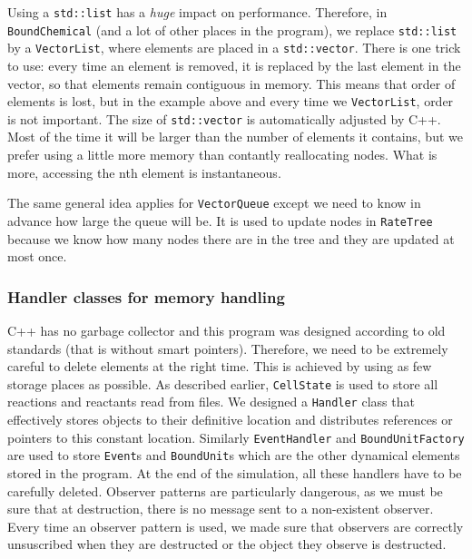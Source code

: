 Using a \texttt{std::list} has a \emph{huge} impact on performance. Therefore, in \texttt{BoundChemical} (and a lot of other places in the program), we replace \texttt{std::list} by a \texttt{VectorList}, where elements are placed in a \texttt{std::vector}. There is one trick to use: every time an element is removed, it is replaced by the last element in the vector, so that elements remain contiguous in memory. This means that order of elements is lost, but in the example above and every time we \texttt{VectorList}, order is not important. The size of \texttt{std::vector} is automatically adjusted by C++. Most of the time it will be larger than the number of elements it contains, but we prefer using a little more memory than contantly reallocating nodes. What is more, accessing the nth element is instantaneous.

The same general idea applies for \texttt{VectorQueue} except we need to know in advance how large the queue will be. It is used to update nodes in \texttt{RateTree} because we know how many nodes there are in the tree and they are updated at most once.

\subsubsection{Handler classes for memory handling}

C++ has no garbage collector and this program was designed according to old standards (that is without smart pointers). Therefore, we need to be extremely careful to delete elements at the right time. This is achieved by using as few storage places as possible. As described earlier, \texttt{CellState} is used to store all reactions and reactants read from files. We designed a \texttt{Handler} class that effectively stores objects to their definitive location and distributes references or pointers to this constant location. Similarly \texttt{EventHandler} and \texttt{BoundUnitFactory} are used to store \texttt{Event}s and \texttt{BoundUnit}s which are the other dynamical elements stored in the program. At the end of the simulation, all these handlers have to be carefully deleted. Observer patterns are particularly dangerous, as we must be sure that at destruction, there is no message sent to a non-existent observer. Every time an observer pattern is used, we made sure that observers are correctly unsuscribed when they are destructed or the object they observe is destructed.
